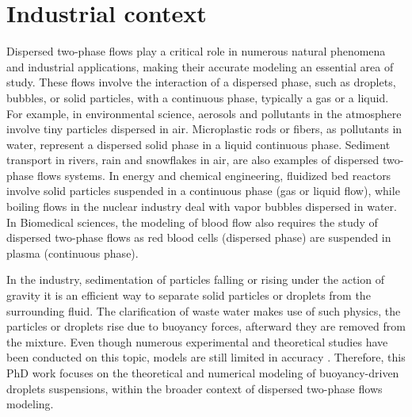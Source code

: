 \section{Industrial context}

Dispersed two-phase flows play a critical role in numerous natural phenomena and industrial applications, making their accurate modeling an essential area of study.
These flows involve the interaction of a dispersed phase, such as droplets, bubbles, or solid particles, with a continuous phase, typically a gas or a liquid. 
For example, in environmental science, aerosols and pollutants in the atmosphere involve tiny particles dispersed in air. 
Microplastic rods or fibers, as pollutants in water, represent a dispersed solid phase in a liquid continuous phase. 
Sediment transport in rivers, rain and snowflakes in air, are also examples of dispersed two-phase flows systems. 
In energy and chemical engineering, fluidized bed reactors involve solid particles suspended in a continuous phase (gas or liquid flow),  while boiling flows in the nuclear industry deal with vapor bubbles dispersed in water. 
In Biomedical sciences, the modeling of blood flow also requires the study of dispersed two-phase flows as red blood cells (dispersed phase) are suspended in plasma (continuous phase). 

In the industry, sedimentation of particles falling or rising under the action of gravity it is an efficient way to separate solid particles or droplets from the surrounding fluid. 
The clarification of waste water makes use of such physics, the particles or droplets rise due to buoyancy forces, afterward they are removed from the mixture.
Even though numerous experimental and theoretical studies have been conducted on this topic, models are still limited in accuracy
 \citep{paisant2014modelisation,gemello2018modelling}. 
Therefore, this PhD work focuses on the theoretical and numerical modeling of buoyancy-driven droplets suspensions,  within the broader context of dispersed two-phase flows modeling.  


